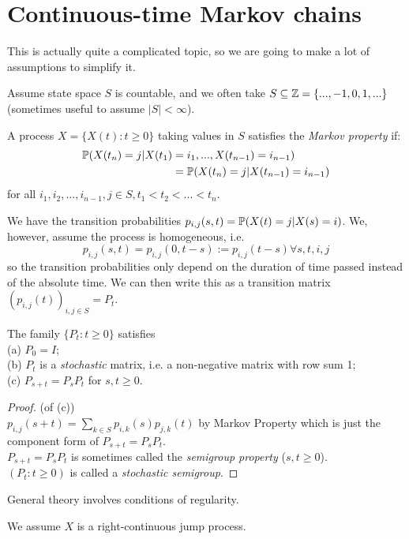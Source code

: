 \documentclass[a4paper]{article}
\begin{document}
\newpage

\section{Continuous-time Markov chains}

This is actually quite a complicated topic, so we are going to make a lot of assumptions to simplify it.

Assume state space $S$ is countable, and we often take $S \subseteq \Z = \{ ...,-1,0,1,...\}$ (sometimes useful to assume $|S|<\infty$).

\begin{defi}
A process $X = \{X(t) : t \geq 0\}$ taking values in $S$ satisfies the \emph{Markov property} if:\\
\begin{equation*}
\begin{aligned}
\P(X(t_n) = j| X(t_1) &= i_1,...,X(t_{n-1}) = i_{n-1}) \\
&= \P(X(t_n) = j| X(t_{n-1}) = i_{n-1})
\end{aligned}
\end{equation*}
for all $i_1,i_2,...,i_{n-1}, j \in S, t_1< t_2 < ... < t_n$.

We have the transition probabilities $p_{i,j}(s,t) = \P(X(t) = j| X(s) = i)$. We, however, assume the process is homogeneous, i.e. $$p_{i,j}(s,t) = p_{i,j} (0,t-s) := p_{i,j}(t-s) \forall s,t,i,j$$so the transition probabilities only depend on the duration of time passed instead of the absolute time. We can then write this as a transition matrix $(p_{i,j}(t))_{i,j \in S}=P_t$.
\end{defi}

\begin{prop}
The family $\{P_t: t \geq 0\}$ satisfies\\
(a) $P_0 = I$;\\
(b) $P_t$ is a \emph{stochastic} matrix, i.e. a non-negative matrix with row sum 1;\\
(c) $P_{s+t} = P_s P_t$ for $s,t \geq 0$.
\begin{proof} (of (c))\\
$p_{i,j}(s+t) = \sum_{k \in S} p_{i,k}(s)p_{j,k}(t)$ by Markov Property which is just the component form of $P_{s+t} = P_s P_t$.\\
$P_{s+t} = P_s P_t$ is sometimes called the \emph{semigroup property} ($s,t \geq 0$).\\
$(P_t:t \geq 0)$ is called a \emph{stochastic semigroup}.
\end{proof}
\end{prop}

General theory involves conditions of regularity.

We assume $X$ is a right-continuous jump process.

\end{document}
